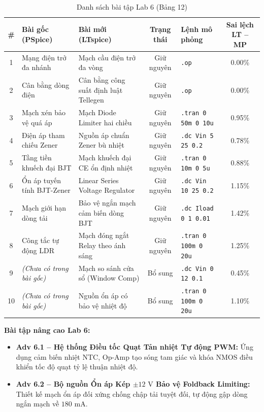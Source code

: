\documentclass[12pt,a4paper]{report}
\begin{document}
\begin{table}[H]
\centering
\caption{Danh sách bài tập Lab 6 (Bảng 12)}
\label{tab:bang12_lab6}
\renewcommand{\arraystretch}{1.2}
\small
\begin{tabularx}{\textwidth}{|c|p{4.0cm}|p{4.0cm}|c|l|c|}
\hline
\rowcolor{codebg}
\textbf{\#} & \textbf{Bài gốc (PSpice)} & \textbf{Bài mới (LTspice)} & \textbf{Trạng thái} & \textbf{Lệnh mô phỏng} & \textbf{Sai lệch LT -- MP} \\ \hline
1 & Mạng điện trở đa nhánh & Mạch cầu điện trở đa vòng & Giữ nguyên & \lstinline|.op| & 0.00\% \\ \hline
2 & Cân bằng dòng điện & Cân bằng công suất định luật Tellegen & Giữ nguyên & \lstinline|.op| & 0.00\% \\ \hline
3 & Mạch xén bảo vệ quá áp & Mạch Diode Limiter hai chiều & Giữ nguyên & \lstinline|.tran 0 50m 0 10u| & 0.95\% \\ \hline
4 & Điện áp tham chiếu Zener & Nguồn áp chuẩn Zener bù nhiệt & Giữ nguyên & \lstinline|.dc Vin 5 25 0.2| & 0.78\% \\ \hline
5 & Tầng tiền khuếch đại BJT & Mạch khuếch đại CE ổn định nhiệt & Giữ nguyên & \lstinline|.tran 0 10m 0 5u| & 0.88\% \\ \hline
6 & Ổn áp tuyến tính BJT-Zener & Linear Series Voltage Regulator & Giữ nguyên & \lstinline|.dc Vin 10 25 0.2| & 1.15\% \\ \hline
7 & Mạch giới hạn dòng tải & Bảo vệ ngắn mạch cảm biến dòng BJT & Giữ nguyên & \lstinline|.dc Iload 0 1 0.01| & 1.42\% \\ \hline
8 & Công tắc tự động LDR & Mạch đóng ngắt Relay theo ánh sáng & Giữ nguyên & \lstinline|.tran 0 100m 0 20u| & 1.25\% \\ \hline
9 & \textit{(Chưa có trong bài gốc)} & Mạch so sánh cửa sổ (Window Comp) & Bổ sung & \lstinline|.dc Vin 0 12 0.1| & 0.45\% \\ \hline
10 & \textit{(Chưa có trong bài gốc)} & Nguồn ổn áp có bảo vệ nhiệt độ & Bổ sung & \lstinline|.tran 0 100m 0 20u| & 1.10\% \\ \hline
\end{tabularx}
\end{table}

\textbf{Bài tập nâng cao Lab 6:}
\begin{itemize}[noitemsep]
    \item \textbf{Adv 6.1 -- Hệ thống Điều tốc Quạt Tản nhiệt Tự động PWM:} Ứng dụng cảm biến nhiệt NTC, Op-Amp tạo sóng tam giác và khóa NMOS điều khiển tốc độ quạt tỷ lệ thuận nhiệt độ.
    \item \textbf{Adv 6.2 -- Bộ nguồn Ổn áp Kép $\pm 12\text{ V}$ Bảo vệ Foldback Limiting:} Thiết kế mạch ổn áp đối xứng chống chập tải tuyệt đối, tự động gập dòng ngắn mạch về $180\text{ mA}$.
\end{itemize}
\end{document}
